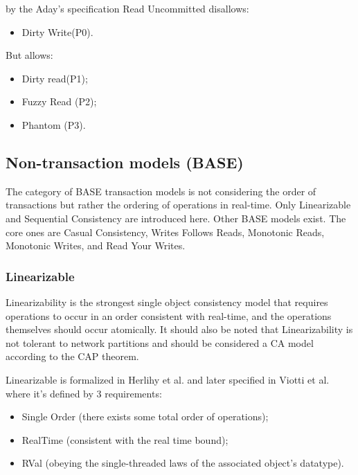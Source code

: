 \documentclass[a4paper,10pt,titlepage]{report}
\begin{document}
by the Aday's specification Read Uncommitted disallows:
\begin{itemize}
    \item Dirty Write(P0).
\end{itemize}
But allows:
\begin{itemize}
    \item Dirty read(P1);
    \item Fuzzy Read (P2);
    \item Phantom (P3).
\end{itemize}

\subsection{Non-transaction models (BASE)}
The category of BASE transaction models is not considering the order of transactions but rather the ordering of operations in real-time. Only Linearizable and Sequential Consistency are introduced here. Other BASE models exist. The core ones are Casual Consistency, Writes Follows Reads, Monotonic Reads, Monotonic Writes, and Read Your Writes.

\subsubsection{Linearizable}
Linearizability is the strongest single object consistency model that requires operations to occur in an order consistent with real-time, and the operations themselves should occur atomically. It should also be noted that Linearizability is not tolerant to network partitions and should be considered a CA model according to the CAP theorem.

Linearizable is formalized in Herlihy et al. \cite{Linearizability} and later specified in Viotti et al. \cite{ConsistencyinNonTransactionalDistributedStorageSystems} where it's defined by 3 requirements:

\begin{itemize}
    \item Single Order (there exists some total order of operations);
    \item RealTime (consistent with the real time bound);
    \item RVal (obeying the single-threaded laws of the associated object's datatype).
\end{itemize}
\end{document}
